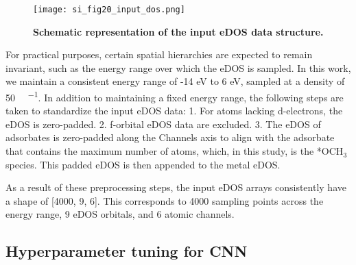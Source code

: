 \begin{figure}
  \centering
  \texttt{[image: si\_fig20\_input\_dos.png]}
  \caption{\textbf{Schematic representation of the input eDOS data structure.}}
  \label{si_fig20:input_dos}
\end{figure}


For practical purposes, certain spatial hierarchies are expected to remain invariant,
such as the energy range over which the eDOS is sampled.
In this work, we maintain a consistent energy range of -14 eV to 6 eV,
sampled at a density of 50 \si{ \cdot {}^{-1}}.
In addition to maintaining a fixed energy range,
the following steps are taken to standardize the input eDOS data:
  1.	For atoms lacking d-electrons, the eDOS is zero-padded.
  2.	f-orbital eDOS data are excluded.
  3.	The eDOS of adsorbates is zero-padded along the Channels axis to align with the adsorbate that contains the maximum number of atoms, which, in this study, is the *OCH$_3$ species. This padded eDOS is then appended to the metal eDOS.

As a result of these preprocessing steps, the input eDOS arrays consistently have a shape of [4000, 9, 6].
This corresponds to 4000 sampling points across the energy range, 9 eDOS orbitals, and 6 atomic channels.


\subsection{Hyperparameter tuning for CNN}

